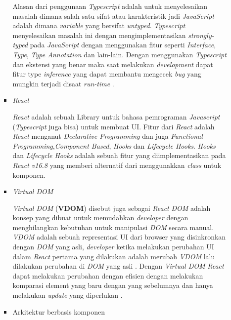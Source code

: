 \documentclass[a4paper]{article}
\begin{document}
\begin{enumerate}[label=\alph*. ]
\begin{enumerate}
\begin{itemize}
                        Alasan dari penggunaan \textit{Typescript} adalah untuk menyelesaikan masalah dimana salah satu sifat atau karakteristik jadi \textit{JavaScript} adalah dimana \textit{variable} yang bersifat \textit{untyped}. \textit{Typescript} menyelesaikan masalah ini dengan mengimplementasikan \textit{strongly-typed} pada \textit{JavaScript} dengan menggunakan fitur seperti \textit{Interface}, \textit{Type}, \textit{Type Annotation} dan lain-lain. Dengan menggunakan \textit{Typescript} dan ekstensi yang benar maka saat melakukan \textit{development} dapat fitur type \textit{inference} yang dapat membantu mengecek \textit{bug} yang mungkin terjadi disaat \textit{run-time} \autocite{TypeScript_official}.

                        \item \textit{React}

                        \textit{React} adalah sebuah Library untuk bahasa pemrograman \textit{Javascript} (\textit{Typescript} juga bisa) untuk membuat UI. Fitur dari \textit{React} adalah \textit{React} menganut \textit{Declarative Programming} dan juga \textit{Functional Programming},\textit{Component Based}, \textit{Hooks} dan \textit{Lifecycle Hooks}\autocite{react-general}. \textit{Hooks} dan \textit{Lifecycle Hooks} adalah sebuah fitur yang diimplementasikan pada \textit{React v16.8} yang memberi alternatif dari menggunakkan \textit{class} untuk komponen\autocite{react-hooks, react-hooks-lifecycle}.

                        \item \textit{Virtual DOM}

                        \textit{Virtual DOM} (\textbf{VDOM}) disebut juga sebagai \textit{React} \textit{DOM} adalah konsep yang dibuat untuk memudahkan \textit{developer} dengan menghilangkan kebutuhan untuk manipulasi \textit{DOM} secara manual. \textit{VDOM} adalah sebuah representasi UI dari browser yang disinkronkan dengan \textit{DOM} yang asli, \textit{developer} ketika melakukan perubahan UI dalam \textit{React} pertama yang dilakukan adalah merubah \textit{VDOM} lalu dilakukan perubahan di \textit{DOM} yang asli \autocite{React_VDOM_DOM}. Dengan \textit{Virtual DOM} \textit{React} dapat melakukan perubahan dengan efisien dengan melakukan komparasi element yang baru dengan yang sebelumnya dan hanya melakukan \textit{update} yang diperlukan \autocite{React_rendering_needed}.

                        \item Arkitektur berbasis komponen


\end{itemize}
\end{enumerate}
\end{enumerate}
\end{document}
